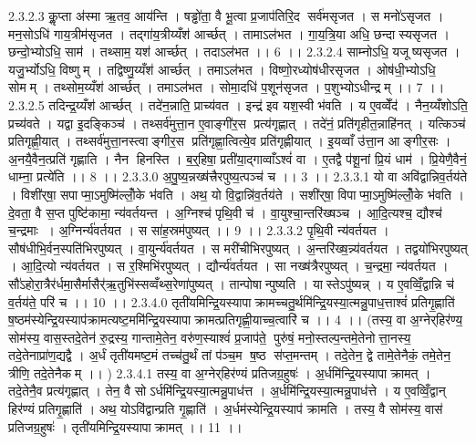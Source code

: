2.3.2.3
कॢ॒प्ता अ॑स्मा ऋ॒तव॒ आय॑न्ति । षड्ढो॑ता॒ वै भू॒त्वा प्र॒जाप॑तिरि॒द सर्व॑मसृजत । स मनो॑ऽसृजत । मन॒सोऽधि॑ गाय॒त्रीम॑सृजत । तद्गा॑य॒त्रीय्यँश॑ आर्च्छत् । तामाऽल॑भत । गा॒य॒त्रि॒या अधि॒ छन्दा॑स्यसृजत । छन्दो॒भ्योऽधि॒ साम॑ । तथ्साम॒ यश॑ आर्च्छत् । तदाऽल॑भत ।। 6 ।।
2.3.2.4
साम्नोऽधि॒ यजू॑ष्यसृजत । यजु॒र्भ्योऽधि॒ विष्णुम् । तद्विष्णु॒य्यँश॑ आर्च्छत् । तमाऽल॑भत । विष्णो॒रध्योष॑धीरसृजत । ओष॑धी॒भ्योऽधि॒ सोमम् । तथ्सोम॒य्यँश॑ आर्च्छत् । तमाऽल॑भत । सोमा॒दधि॑ प॒शून॑सृजत । प॒शुभ्योऽधीन्द्रम् ।। 7 ।।
2.3.2.5
तदिन्द्र॒य्यँश॑ आर्च्छत् । तदे॑न॒न्नाति॒ प्राच्य॑वत । इन्द्र॑ इव यश॒स्वी भ॑वति । य ए॒वव्वेँद॑ । नैन॒य्यँशोऽति॒ प्रच्य॑वते । यद्वा इ॒दङ्किञ्च॑ । तथ्सर्व॑मुत्ता॒न ए॒वाङ्गी॑र॒स प्रत्य॑गृह्णात् । तदे॑नं॒ प्रति॑गृहीत॒न्नाहि॑नत् । यत्किञ्च॑ प्रतिगृह्णी॒यात् । तथ्सर्व॑मुत्ता॒नस्त्वाङ्गीर॒स प्रति॑गृह्णा॒त्वित्ये॒व प्रति॑गृह्णीयात् । इ॒यव्वाँ उ॑त्ता॒न आङ्गीर॒सः । अ॒नयै॒वैन॒त्प्रति॑ गृह्णाति । नैन॑ हिनस्ति । ब॒र्॒हिषा॒ प्रती॑या॒द्गाव्वाँऽश्वं॑ वा । ए॒तद्वै प॑शू॒नां प्रि॒यं धाम॑ । प्रि॒येणै॒वैनं॒ धाम्ना॒ प्रत्ये॑ति ।। 8 ।।
2.3.3.0
अ॒पु॒ष्य॒न्नख्ष॑त्त्रैरपुष्य॒त्पञ्च॑ च ।। 3 ।।
2.3.3.1
यो वा अवि॑द्वान्निव॒र्तय॑ते । विशी॑र्‌षा॒ सपाप्मा॒ऽमुष्मि॑ल्लोँ॒के भ॑वति । अथ॒ यो वि॒द्वान्नि॑व॒र्तय॑ते । सशी॑र्‌षा॒ विपाप्मा॒ऽमुष्मि॑ल्लोँ॒के भ॑वति । दे॒वता॒ वै स॒प्त पुष्टि॑कामा॒ न्य॑वर्तयन्त । अ॒ग्निश्च॑ पृथि॒वी च॑ । वा॒युश्चा॒न्तरि॑ख्षञ्च । आ॒दि॒त्यश्च॒ द्यौश्च॑ च॒न्द्रमाः । अ॒ग्निर्न्य॑वर्तयत । स सा॑ह॒स्रम॑पुष्यत् ।। 9 ।।
2.3.3.2
पृ॒थि॒वी न्य॑वर्तयत । सौष॑धीभि॒र्वन॒स्पति॑भिरपुष्यत् । वा॒युर्न्य॑वर्तयत । स मरी॑चीभिरपुष्यत् । अ॒न्तरि॑ख्ष॒न्न्य॑वर्तयत । तद्वयो॑भिरपुष्यत् । आ॒दि॒त्यो न्य॑वर्तयत । स र॒श्मिभि॑रपुष्यत् । द्यौर्न्य॑वर्तयत । सा नख्ष॑त्रैरपुष्यत् । च॒न्द्रमा॒ न्य॑वर्तयत । सौ॑ऽहोरा॒त्रैर॑र्धमा॒सैर्मासैर्॑ऋ॒तुभि॑स्सव्वँथ्स॒रेणा॑पुष्यत् । तान्पोषान्पुष्यति । यास्तेऽपु॑ष्यन्न् । य ए॒वव्विँ॒द्वान्नि च॑ व॒र्तय॑ते॒ परि॑ च ।। 10 ।।
2.3.4.0
तृती॑यमिन्द्रि॒यस्यापाक्रामच्चतु॒र्थमि॑न्द्रि॒यस्या॒त्मन्नु॒पाध॒त्ताश्वं॑ प्रतिगृ॒ह्णाति॑ ष॒ष्ठम॑स्येन्द्रि॒यस्याप॑क्रामत्यष्ट॒ममि॑न्द्रि॒यस्यापाक्रामत्प्रतिगृह्णी॒याच्च॒त्वारि॑ च ।। 4 ।। (तस्य॒ वा अ॒ग्नेर्‌हिर॑ण्य॒॒ सोम॑स्य॒ वास॒स्तदे॒तेन॑ रु॒द्रस्य॒ गान्तामे॒तेन॒ वरु॑ण॒स्याश्वं॑ प्र॒जाप॑ते॒ पुरु॑षं॒ मनो॒स्तल्प॒न्तमे॒तेनोत्ता॒नस्य॒ तदे॒तेनाप्रा॑ण॒द्यद्वै । अ॒र्धं तृती॑यमष्ट॒मं तच्च॑तु॒र्थं तां प॑ञ्च॒म ष॒ष्ठ स॑प्त॒मन्तम् । तदे॒तेन॒ द्वे तामे॒तेनैकं॒ तमे॒तेन॒ त्रीणि॒ तदे॒तेनैकम् ।। )
2.3.4.1
तस्य॒ वा अ॒ग्नेर्‌हिर॑ण्यं प्रतिजग्र॒हुषः॑ । अ॒र्धमि॑न्द्रि॒यस्यापाक्रामत् । तदे॒तेनै॒व प्रत्य॑गृह्णात् । तेन॒ वै सोऽर्धमि॑न्द्रि॒यस्या॒त्मन्नु॒पाध॑त्त । अ॒र्धमि॑न्द्रि॒यस्या॒त्मन्नु॒पाध॑त्ते । य ए॒वव्विँ॒द्वान् हिर॑ण्यं प्रतिगृ॒ह्णाति॑ । अथ॒ योऽवि॑द्वान्प्रति गृ॒ह्णाति॑ । अ॒र्धम॑स्येन्द्रि॒यस्याप॑ क्रामति । तस्य॒ वै सोम॑स्य॒ वास॑ प्रतिजग्र॒हुषः॑ । तृती॑यमिन्द्रि॒यस्यापाक्रामत् ।। 11 ।।
